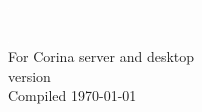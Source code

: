 
\cleardoublepage
\thispagestyle{empty} 
\includegraphics{Images/pixel.png}

\newpage
\thispagestyle{empty} 

\includegraphics{Images/pixel.png}\\[187mm] 
\vfill
{
\large For Corina server and desktop\\
version \versionnumber\\[2mm]
Compiled \today\\[4mm]
}
